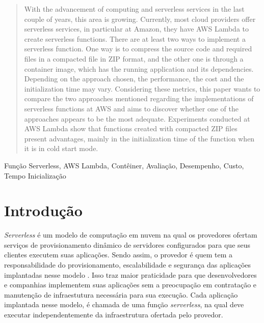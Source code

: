 \documentclass[conference]{IEEEtran}
\renewcommand{\abstractname}{Resumo}
\begin{document}
\renewcommand{\abstractname}{Abstract}
\begin{abstract}
With the advancement of computing and serverless services in the last couple of years, this area is growing. Currently, most cloud providers offer serverless services, in particular at Amazon, they have AWS Lambda to create serverless functions. There are at least two ways to implement a serverless function. One way is to compress the source code and required files in a compacted file in ZIP format, and the other one is through a container image, which has the running application and its dependencies. Depending on the approach chosen, the performance, the cost and the initialization time may vary. Considering these metrics, this paper wants to compare the two approaches mentioned regarding the implementations of serverless functions at AWS and aims to discover whether one of the approaches appears to be the most adequate. Experiments conducted at AWS Lambda show that functions created with compacted ZIP files present advantages, mainly in the initialization time of the function when it is in cold start mode.

\end{abstract}

\begin{IEEEkeywords}
Função Serverless, AWS Lambda, Contêiner, Avaliação, Desempenho, Custo, Tempo Inicialização
\end{IEEEkeywords}


\section{Introdução}
\label{sec:Intro}

\textit{Serverless} é um modelo de computação em nuvem na qual os provedores ofertam serviços de provisionamento dinâmico  de servidores configurados para que seus clientes executem suas aplicações. Sendo assim, o provedor é quem tem a responsabilidade do provisionamento, escalabilidade e segurança das aplicações  implantadas nesse modelo \cite{Nupponen_2020_serverless_what_it_is}.
Isso traz maior praticidade para que desenvolvedores e companhias implementem suas aplicações sem a preocupação em contratação e manutenção de infraestutura necessária para sua execução. 
Cada aplicação implantada nesse modelo, é chamada de uma função \textit{serverless}, na qual deve executar independentemente da infraestrutura ofertada pelo provedor.
\end{document}

